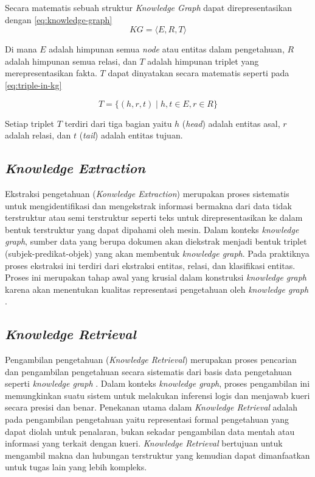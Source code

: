Secara matematis sebuah struktur \textit{Knowledge Graph} dapat direpresentasikan dengan \ref{eq:knowledge-graph}
\begin{equation}
	\text{$KG$} = \langle E, R, T \rangle
	\label{eq:knowledge-graph}
\end{equation}

Di mana $E$ adalah himpunan semua \textit{node} atau entitas dalam pengetahuan, $R$ adalah himpunan semua relasi, dan $T$ adalah himpunan triplet yang merepresentasikan fakta.
$T$ dapat dinyatakan secara matematis seperti pada \ref{eq:triple-in-kg}

\begin{equation}
	T = \{(h,r,t) \mid h,t \in E, r \in R\}
	\label{eq:triple-in-kg}
\end{equation}

Setiap triplet $T$ terdiri dari tiga bagian yaitu $h$ (\textit{head}) adalah entitas asal, $r$ adalah relasi, dan $t$ (\textit{tail}) adalah entitas tujuan.

\subsection{\textit{Knowledge Extraction}}
Ekstraksi pengetahuan (\textit{Konwledge Extraction}) merupakan proses sistematis untuk mengidentifikasi dan mengekstrak informasi bermakna dari data tidak terstruktur atau semi terstruktur seperti teks untuk direpresentasikan ke dalam bentuk terstruktur yang dapat dipahami oleh mesin.
Dalam konteks \textit{knowledge graph}, sumber data yang berupa dokumen akan diekstrak menjadi bentuk triplet (subjek-predikat-objek) yang akan membentuk \textit{knowledge graph}.
Pada praktiknya proses ekstraksi ini terdiri dari ekstraksi entitas, relasi, dan klasifikasi entitas.
Proses ini merupakan tahap awal yang krusial dalam konstruksi \textit{knowledge graph} karena akan menentukan kualitas representasi pengetahuan oleh \textit{knowledge graph} \cite{Choi2025KnowledgeGraphConstruction}.

\subsection{\textit{Knowledge Retrieval}}
Pengambilan pengetahuan (\textit{Knowledge Retrieval}) merupakan proses pencarian dan pengambilan pengetahuan secara sistematis dari basis data pengetahuan seperti \textit{knowledge graph} \cite{Yao2007KnowledgeRetrieval}.
Dalam konteks \textit{knowledge graph}, proses pengambilan ini memungkinkan suatu sistem untuk melakukan inferensi logis dan menjawab kueri secara presisi dan benar.
Penekanan utama dalam \textit{Knowledge Retrieval} adalah pada pengambilan pengetahuan yaitu representasi formal pengetahuan yang dapat diolah untuk penalaran, bukan sekadar pengambilan data mentah atau informasi yang terkait dengan kueri.
\textit{Knowledge Retrieval} bertujuan untuk mengambil makna dan hubungan terstruktur yang kemudian dapat dimanfaatkan untuk tugas lain yang lebih kompleks.


